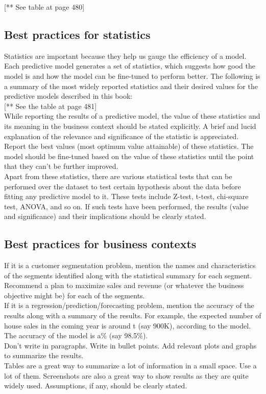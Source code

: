 \documentclass{article}
\numberwithin{equation}{section} %
\begin{document}
[** See table at page 480]

\subsection*{Best practices for statistics}

Statistics are important because they help us gauge the efficiency of a model. Each predictive model generates a set of statistics, which suggests how good the model is and how the model can be fine-tuned to perform better. The following is a summary of the most widely reported statistics and their desired values for the predictive models described in this book:\\

[** See the table at page 481] \\

While reporting the results of a predictive model, the value of these statistics and
its meaning in the business context should be stated explicitly. A brief and lucid
explanation of the relevance and significance of the statistic is appreciated. Report the best values (most optimum value attainable) of these statistics. The model should be fine-tuned based on the value of these statistics until the point that they can't be further improved. \\

Apart from these statistics, there are various statistical tests that can be performed over the dataset to test certain hypothesis about the data before fitting any predictive model to it. These tests include Z-test, t-test, chi-square test, ANOVA, and so on. If such tests have been performed, the results (value and significance) and their implications should be clearly stated. \\


\subsection*{Best practices for business contexts}

If it is a customer segmentation problem, mention the names and characteristics
of the segments identified along with the statistical summary for each segment.
Recommend a plan to maximize sales and revenue (or whatever the business
objective might be) for each of the segments. \\

If it is a regression/prediction/forecasting problem, mention the accuracy of the
results along with a summary of the results. For example, the expected number of
house sales in the coming year is around t (say 900K), according to the model. The
accuracy of the model is a\% (say 98.5\%). \\

Don't write in paragraphs. Write in bullet points. Add relevant plots and graphs to
summarize the results. \\

Tables are a great way to summarize a lot of information in a small space. Use a lot of them. Screenshots are also a great way to show results as they are quite widely used. Assumptions, if any, should be clearly stated. \\
\end{document}
